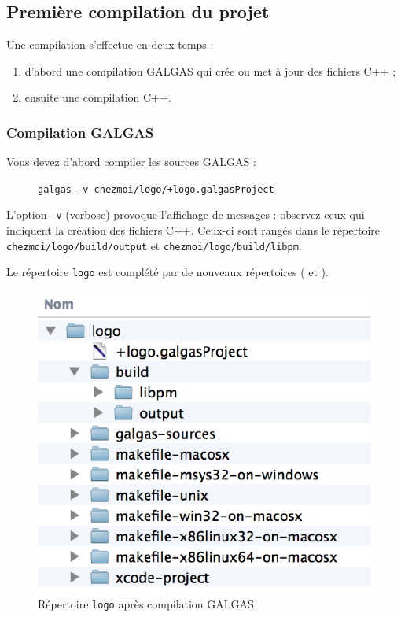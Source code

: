 \subsection{Première compilation du projet}

Une compilation s'effectue en deux temps :
\begin{enumerate}
  \item d'abord une compilation GALGAS qui crée ou met à jour des fichiers C++ ;
  \item ensuite une compilation C++.
\end{enumerate}


\subsubsection{Compilation GALGAS}

Vous devez d'abord compiler les sources GALGAS :
\begin{description}
  \item[ ] \texttt{galgas -v chezmoi/logo/+logo.galgasProject}
\end{description}

L'option \texttt{-v} (verbose) provoque l'affichage de messages : observez ceux qui indiquent la création des fichiers C++. Ceux-ci sont rangés dans le répertoire \texttt{chezmoi/logo/build/output} et \texttt{chezmoi/logo/build/libpm}.

Le répertoire \texttt{logo} est complété par de nouveaux répertoires ( et ).
\begin{figure}[t]
  \centering
  \includegraphics{partie-utilisation/repertoire-logo.pdf}
  \caption{Répertoire \texttt{logo} après compilation GALGAS}
  \ligne
\end{figure}


